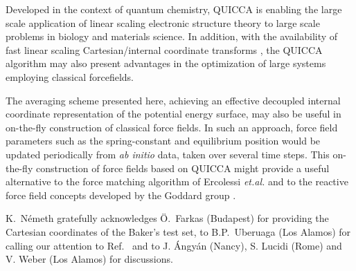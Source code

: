\documentclass[prl,twocolumn,showpacs,twocolumngrid,superbib]{revtex4}
\begin{document}
Developed in the context of quantum chemistry, QUICCA is enabling the large scale application of  
linear scaling electronic structure theory to large scale problems in biology and materials science. 
In addition, with the availability of fast linear scaling Cartesian/internal coordinate transforms 
\cite{nemeth_coordtrf1}, the QUICCA algorithm may also present advantages in the optimization of 
large systems employing classical forcefields.

The averaging scheme presented here, achieving an effective decoupled internal coordinate representation
of the potential energy surface, may also be useful in on-the-fly construction of classical force fields.
In such an approach, force field parameters such as the spring-constant and equilibrium position 
would be updated periodically from {\em ab initio} data, taken over several time steps. 
This on-the-fly construction of force fields based on QUICCA might provide a useful  alternative to 
the force matching algorithm of Ercolessi {\it et.al.} \cite{force-matching} and to the reactive 
force field concepts developed by the Goddard group \cite{reaxff1,reaxff2}.

\begin{acknowledgments}
K.~N{\'e}meth gratefully acknowledges {\"{O}}.~Farkas (Budapest) for providing the 
Cartesian coordinates of the Baker's test set, to B.P.~Uberuaga (Los Alamos) for 
calling our attention to Ref.~\cite{force-matching} and to J. {\'A}ngy{\'a}n
(Nancy), S. Lucidi (Rome) and V. Weber (Los Alamos) for discussions.
\end{acknowledgments}


\end{document}
